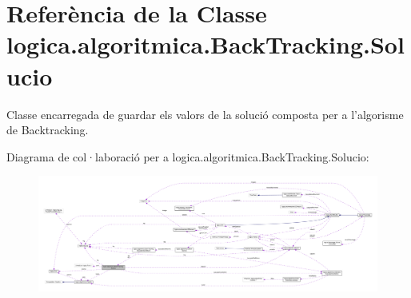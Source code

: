\hypertarget{classlogica_1_1algoritmica_1_1_back_tracking_1_1_solucio}{\section{Referència de la Classe logica.\+algoritmica.\+Back\+Tracking.\+Solucio}
\label{classlogica_1_1algoritmica_1_1_back_tracking_1_1_solucio}
}


Classe encarregada de guardar els valors de la solució composta per a l'algorisme de Backtracking.  




Diagrama de col·laboració per a logica.\+algoritmica.\+Back\+Tracking.\+Solucio\+:
\nopagebreak
\begin{figure}[H]
\begin{center}
\leavevmode
\includegraphics[width=350pt]{classlogica_1_1algoritmica_1_1_back_tracking_1_1_solucio__coll__graph}
\end{center}
\end{figure}

